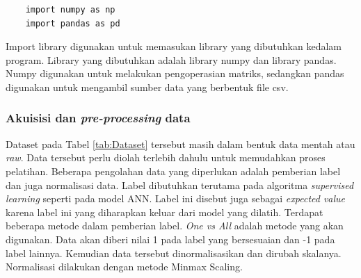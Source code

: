 \begin{lstlisting}
    import numpy as np
    import pandas as pd
\end{lstlisting}

Import library digunakan untuk memasukan library yang dibutuhkan kedalam program. Library yang dibutuhkan adalah library numpy dan library pandas. Numpy digunakan untuk melakukan pengoperasian matriks, sedangkan pandas digunakan untuk mengambil sumber data yang berbentuk file csv.

\subsubsection{Akuisisi dan \textit{pre-processing} data}

Dataset pada Tabel \ref{tab:Dataset} tersebut masih dalam bentuk data mentah atau \textit{raw}. Data tersebut perlu diolah terlebih dahulu untuk memudahkan proses pelatihan. Beberapa pengolahan data yang diperlukan adalah pemberian label dan juga normalisasi data. Label dibutuhkan terutama pada algoritma \textit{supervised learning} seperti pada model ANN. Label ini disebut juga sebagai \textit{expected value} karena label ini yang diharapkan keluar dari model yang dilatih. Terdapat beberapa metode dalam pemberian label. \textit{One vs All} adalah metode yang akan digunakan. Data akan diberi nilai 1 pada label yang bersesuaian dan -1 pada label lainnya. Kemudian data tersebut dinormalisasikan dan dirubah skalanya. Normalisasi dilakukan dengan metode Minmax Scaling.

